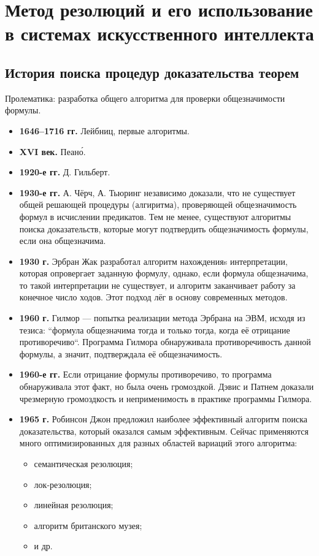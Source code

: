 \documentclass[a4paper,12pt]{report}
\begin{document}
\section{Метод резолюций и его использование в системах искусственного
	интеллекта}


\subsection{История поиска процедур доказательства теорем}

	Пролематика: разработка общего алгоритма для проверки общезначимости формулы.
	\begin{itemize}
		\item \textbf{1646–1716 гг.} Лейбниц, первые алгоритмы.
		\item \textbf{XVI век.} Пеано́.
		\item \textbf{1920-е гг.} Д. Гильберт.
		\item \textbf{1930-е гг.} А. Чёрч, А. Тьюринг независимо доказали, что не
			существует общей решающей процедуры (алгиритма), проверяющей
			общезначимость формул в исчислении предикатов. Тем не менее, существуют
			алгоритмы поиска доказательств, которые могут подтвердить общезначимость
			формулы, если она общезначима.
		\item \textbf{1930 г.} Эрбран Жак разработал алгоритм нахожденияs
			интерпретации, которая опровергает заданную формулу, однако, если формула
			общезначима, то такой интерпретации не существует, и алгоритм заканчивает
			работу за конечное число ходов. Этот подход лёг в основу современных
			методов.
		\item \textbf{1960 г.} Гилмор — попытка реализации метода Эрбрана на ЭВМ,
			исходя из тезиса: ``формула общезначима тогда и только тогда, когда её
			отрицание противоречиво``. Программа Гилмора обнаруживала
			противоречивость данной формулы, а значит, подтверждала её
			общезначимость.
		\item \textbf{1960-е гг.} Если отрицание формулы противоречиво, то
			программа обнаруживала этот факт, но была очень громоздкой. Дэвис и
			Патнем доказали чрезмерную громоздкость и неприменимость в практике
			программы Гилмора.
		\item \textbf{1965 г.} Робинсон Джон предложил наиболее эффективный
			алгоритм поиска доказательства, который оказался самым эффективным.
			Сейчас применяются много оптимизированных для разных областей вариаций
			этого алгоритма:
			\begin{itemize}
				\item семантическая резолюция;
				\item лок-резолюция;
				\item линейная резолюция;
				\item алгоритм британского музея;
				\item и др.
			\end{itemize}
	\end{itemize}
\end{document}
